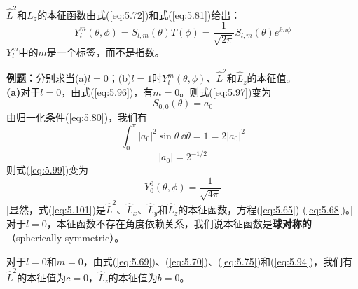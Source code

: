     $\hat{L}^2$和$\hat{L}_z$的本征函数由式(\ref{eq:5.72})和式(\ref{eq:5.81})给出：
    \begin{equation}
        \boxed{
            Y^m_l\left(\theta,\phi\right) = S_{l,m}\left(\theta\right)T\left(\phi\right) = \frac{1}{\sqrt{2\pi}}S_{l,m}\left(\theta\right)e^{\ii m\phi}
        }
        \label{eq:5.99}
    \end{equation}
    $Y^m_l$中的$m$是一个标签，而不是指数。
    \begin{examplebox}
        \textbf{例题：}分别求当(a)$l=0$；(b)$l=1$时$Y_l^m\left(\theta,\phi\right)$、$\hat{L}^2$和$\hat{L}_z$的本征值。
        \\

        \textbf{(a)}对于$l=0$，由式(\ref{eq:5.96})，有$m=0$。则式(\ref{eq:5.97})变为
        \begin{equation}
            S_{0,0}\left(\theta\right) = a_0
            \label{eq:5.100}
        \end{equation}
        由归一化条件(\ref{eq:5.80})，我们有
        \begin{equation*}
            \int_{0}^{\pi}\left|a_0\right|^2 \sin\theta \: \dd \theta = 1 = 2\left|a_0\right|^2
        \end{equation*}
        \begin{equation*}
            \left|a_0\right| = 2^{-1/2}
        \end{equation*}
        则式(\ref{eq:5.99})变为
        \begin{equation}
            Y^0_0\left(\theta,\phi\right) = \frac{1}{\sqrt{4\pi}}
            \label{eq:5.101}
        \end{equation}
        [显然，式(\ref{eq:5.101})是$\hat{L}^2$、$\hat{L}_x$、$\hat{L}_y$和$\hat{L}_z$的本征函数，方程(\ref{eq:5.65})-(\ref{eq:5.68})。]对于$l=0$，本征函数不存在角度依赖关系，我们说本征函数是\textbf{球对称的}（spherically symmetric）。

        对于$l=0$和$m=0$，由式(\ref{eq:5.69})、(\ref{eq:5.70})、(\ref{eq:5.75})和(\ref{eq:5.94})，我们有$\hat{L}^2$的本征值为$c=0$，$\hat{L}_z$的本征值为$b=0$。


\end{examplebox}
